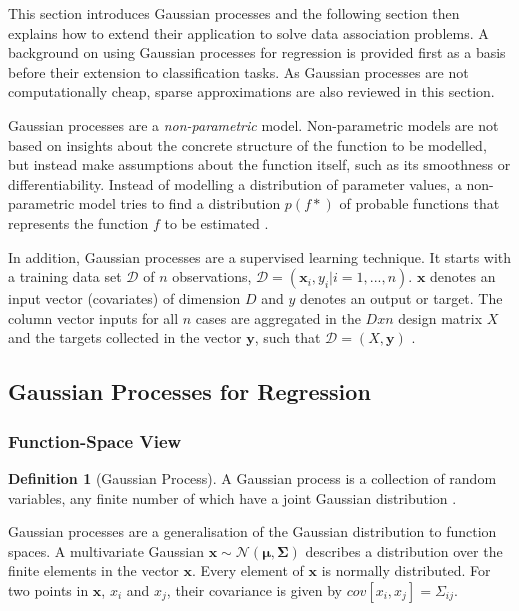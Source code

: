 \documentclass[12pt,a4paper]{report}
\theoremstyle{definition}
\newtheorem{definition}{Definition}[section]
\begin{document}
This section introduces Gaussian processes and the following section then explains how to extend their application to solve data association problems. 
A background on using Gaussian processes for regression is provided first as a basis before their extension to classification tasks. 
As Gaussian processes are not computationally cheap, sparse approximations are also reviewed in this section.

Gaussian processes are a \emph{non-parametric} model. 
Non-parametric models are not based on insights about the concrete structure of the function to be modelled, but instead make assumptions about the function itself, such as its smoothness or differentiability. 
Instead of modelling a distribution of parameter values, a non-parametric model tries to find a distribution $p(f*)$ of probable functions that represents the function $f$ to be estimated \citep{Kaiser2017}.

In addition, Gaussian processes are a supervised learning technique. 
It starts with a training data set $\mathcal{D}$ of $n$ observations, $\mathcal{D} = (\textbf{x}_{i}, y_{i} | i = 1, ..., n)$.
$\textbf{x}$ denotes an input vector (covariates) of dimension $D$ and $y$ denotes an output or target. 
The column vector inputs for all $n$ cases are aggregated in the $D x n$ design matrix $X$ and the targets collected in the vector $\textbf{y}$, such that $\mathcal{D} = (X, \textbf{y})$ \citep{RasmussenWilliams2006}.

\subsection{Gaussian Processes for Regression}

\subsubsection{Function-Space View}

\begin{definition}[Gaussian Process]
A Gaussian process is a collection of random variables, any finite number of which have a joint Gaussian distribution \citep{RasmussenWilliams2006}.
\end{definition}

Gaussian processes are a generalisation of the Gaussian distribution to function spaces. 
A multivariate Gaussian $\textbf{x} \sim \mathcal{N} (\boldsymbol{\mu}, \boldsymbol{\Sigma})$ describes a distribution over the finite elements in the vector $\textbf{x}$. 
Every element of $\textbf{x}$ is normally distributed. 
For two points in $\textbf{x}$, $x_{i}$ and $x_{j}$, their covariance is given by $cov[x_{i}, x_{j}] = \Sigma_{ij}$.
\end{document}

